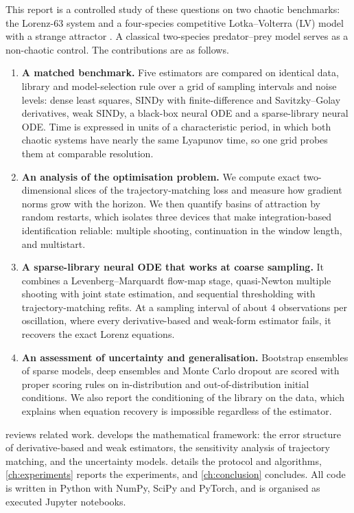 This report is a controlled study of these questions on two chaotic benchmarks: the Lorenz-63 system \parencite{lorenz1963} and a four-species competitive Lotka--Volterra (LV) model with a strange attractor \parencite{vano2006chaos}. A classical two-species predator--prey model serves as a non-chaotic control. The contributions are as follows.
\begin{enumerate}
  \item \textbf{A matched benchmark.} Five estimators are compared on identical data, library and model-selection rule over a grid of sampling intervals and noise levels: dense least squares, SINDy with finite-difference and Savitzky--Golay derivatives, weak SINDy, a black-box neural ODE and a sparse-library neural ODE. Time is expressed in units of a characteristic period, in which both chaotic systems have nearly the same Lyapunov time, so one grid probes them at comparable resolution.
  \item \textbf{An analysis of the optimisation problem.} We compute exact two-dimensional slices of the trajectory-matching loss and measure how gradient norms grow with the horizon. We then quantify basins of attraction by random restarts, which isolates three devices that make integration-based identification reliable: multiple shooting, continuation in the window length, and multistart.
  \item \textbf{A sparse-library neural ODE that works at coarse sampling.} It combines a Levenberg--Marquardt flow-map stage, quasi-Newton multiple shooting with joint state estimation, and sequential thresholding with trajectory-matching refits. At a sampling interval of about $4$ observations per oscillation, where every derivative-based and weak-form estimator fails, it recovers the exact Lorenz equations.
  \item \textbf{An assessment of uncertainty and generalisation.} Bootstrap ensembles of sparse models, deep ensembles and Monte Carlo dropout are scored with proper scoring rules on in-distribution and out-of-distribution initial conditions. We also report the conditioning of the library on the data, which explains when equation recovery is impossible regardless of the estimator.
\end{enumerate}

 reviews related work.  develops the mathematical framework: the error structure of derivative-based and weak estimators, the sensitivity analysis of trajectory matching, and the uncertainty models.  details the protocol and algorithms, \cref{ch:experiments} reports the experiments, and \cref{ch:conclusion} concludes. All code is written in Python with NumPy, SciPy and PyTorch, and is organised as executed Jupyter notebooks.
